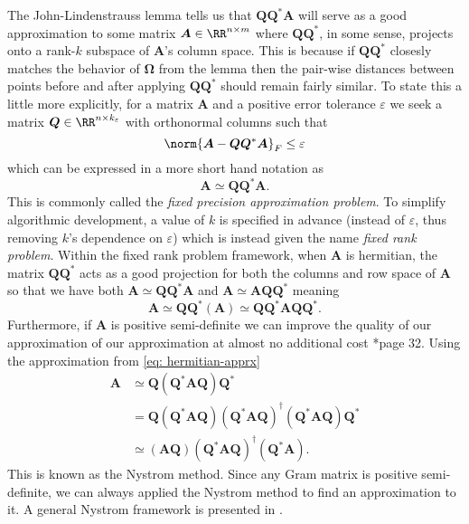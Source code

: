 The John-Lindenstrauss lemma tells us that $\bm{Q} \bm{Q}^{\ast} \bm{A}$ will serve as a good approximation to some matrix $\bm{A} \in \RR^{n \times m}$ where $\bm{Q} \bm{Q}^{\ast}$, in some sense, projects onto a rank-$k$ subspace of $\bm{A}$'s column space. This is because if $\bm{Q} \bm{Q}^{\ast}$ closesly matches the behavior of $\bm{\Omega}$ from the lemma then the pair-wise distances between points before and after applying $\bm{Q} \bm{Q}^{\ast}$ should remain fairly similar. To state this a little more explicitly, for a matrix $\bm{A}$ and a positive error tolerance $\varepsilon$ we seek a matrix $\bm{Q} \in \RR^{n \times k_{\varepsilon}}$ with orthonormal columns such that
\begin{equation*}
    \norm{\bm{A} - \bm{Q} \bm{Q}^{\ast} \bm{A}}_{F} \leq \varepsilon
\end{equation*}
which can be expressed in a more short hand notation as
\begin{equation} \label{eq: nys-Q-cond}
    \bm{A} \simeq \bm{Q} \bm{Q}^{\ast} \bm{A}.
\end{equation}
This is commonly called the {\it fixed precision approximation problem}. To simplify algorithmic development, a value of $k$ is specified in advance (instead of $\varepsilon$, thus removing $k$'s dependence on $\varepsilon$) which is instead given the name {\it fixed rank problem}. Within the fixed rank problem framework, when $\bm{A}$ is hermitian, the matrix $\bm{Q} \bm{Q}^{\ast}$ acts as a good projection for both the columns and row space of $\bm{A}$ so that we have both $\bm{A} \simeq \bm{Q} \bm{Q}^{\ast} \bm{A}$ and $\bm{A} \simeq \bm{A} \bm{Q} \bm{Q}^{\ast}$ meaning
\begin{equation} \label{eq: hermitian-apprx}
    \bm{A} \simeq \bm{Q} \bm{Q}^{\ast} \left( \bm{A} \right) \simeq \bm{Q} \bm{Q}^{\ast} \bm{A} \bm{Q} \bm{Q}^{\ast}.
\end{equation}
Furthermore, if $\bm{A}$ is positive semi-definite we can improve the quality of our approximation of our approximation at almost no additional cost \cite{halko2011finding}*{page 32}. Using the approximation from \ref{eq: hermitian-apprx}
\begin{align} \label{eq: nys-apprx}
    \bm{A} & \simeq \bm{Q} \left( \bm{Q}^{\ast} \bm{A} \bm{Q} \right) \bm{Q}^{\ast} \nonumber                                                                                            \\
           & = \bm{Q} \left( \bm{Q}^{\ast} \bm{A} \bm{Q} \right) \left( \bm{Q}^{\ast} \bm{A} \bm{Q} \right)^{\dagger} \left( \bm{Q}^{\ast} \bm{A} \bm{Q} \right) \bm{Q}^{\ast} \nonumber \\
           & \simeq \left( \bm{A} \bm{Q} \right) \left( \bm{Q}^{\ast} \bm{A} \bm{Q} \right)^{\dagger} \left( \bm{Q}^{\ast} \bm{A} \right).
\end{align}
This is known as the Nystrom method. Since any Gram matrix is positive semi-definite, we can always applied the Nystrom method to find an approximation to it. A general Nystrom framework is presented in .

